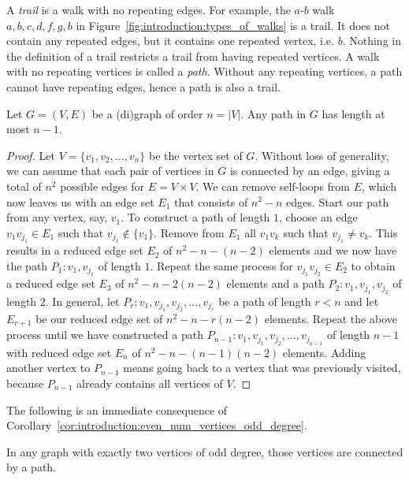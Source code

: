 A \emph{trail} is a walk with no repeating edges. For example, the
$a$-$b$ walk $a, b, c, d, f, g, b$ in
Figure~\ref{fig:introduction:types_of_walks} is a trail. It does not
contain any repeated edges, but it contains one repeated vertex,
i.e. $b$. Nothing in the definition of a trail restricts a trail from
having repeated vertices.
A walk with no repeating vertices is called a \emph{path}. Without any
repeating vertices, a path cannot have repeating edges, hence a path
is also a trail.

\begin{corollary}
\label{cor:introduction:any_path_has_length_at_most_n_minus_1}
Let $G = (V, E)$ be a (di)graph of order $n = |V|$. Any path in $G$
has length at most $n - 1$.
\end{corollary}

\begin{proof}
Let $V = \{v_1, v_2, \dots, v_n\}$ be the vertex set of $G$. Without
loss of generality, we can assume that each pair of vertices in $G$ is
connected by an edge, giving a total of $n^2$ possible edges for
$E = V \times V$. We can remove self-loops from $E$, which now leaves
us with an edge set $E_1$ that consists of $n^2 - n$ edges. Start our
path from any vertex, say, $v_1$. To construct a path of length $1$,
choose an edge $v_1 v_{j_1} \in E_1$ such that
$v_{j_1} \notin \{v_1\}$. Remove from $E_1$ all $v_1 v_k$ such that
$v_{j_1} \neq v_k$. This results in a reduced edge set $E_2$ of
$n^2 - n - (n - 2)$ elements and we now have the path
$P_1: v_1, v_{j_1}$ of length $1$. Repeat the same process for
$v_{j_1} v_{j_2} \in E_2$ to obtain a reduced edge set $E_3$ of
$n^2 - n - 2(n - 2)$ elements and a path $P_2: v_1, v_{j_1}, v_{j_2}$
of length $2$. In general, let
$P_r: v_1, v_{j_1}, v_{j_2}, \dots, v_{j_r}$ be a path of length
$r < n$ and let $E_{r+1}$ be our reduced edge set of
$n^2 - n - r(n - 2)$ elements. Repeat the above process until we have
constructed a path
$P_{n-1}: v_1, v_{j_1}, v_{j_2}, \dots, v_{j_{n-1}}$ of length $n - 1$
with reduced edge set $E_n$ of $n^2 - n - (n - 1)(n - 2)$
elements. Adding another vertex to $P_{n-1}$ means going back to a
vertex that was previously visited, because $P_{n-1}$ already contains
all vertices of $V$.
\end{proof}

The following is an immediate consequence of
Corollary~\ref{cor:introduction:even_num_vertices_odd_degree}.

\begin{corollary}
In any graph with exactly two vertices of odd degree, those vertices
are connected by a path.
\end{corollary}

